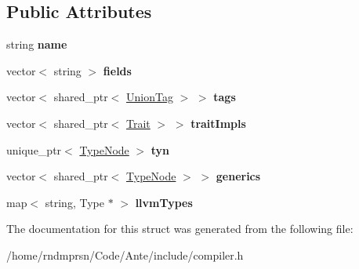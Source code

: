 \subsection*{Public Attributes}
\begin{DoxyCompactItemize}
\item 
\mbox{\label{structDataType_a27d0cdc5038d5ac6fc17c049f8dd8e9f}} 
string {\bfseries name}
\item 
\mbox{\label{structDataType_aa8650db01d88d73a10629db8590322a2}} 
vector$<$ string $>$ {\bfseries fields}
\item 
\mbox{\label{structDataType_ac62dd93ccfd6773019ab3aae0406cceb}} 
vector$<$ shared\+\_\+ptr$<$ \hyperlink{structUnionTag}{Union\+Tag} $>$ $>$ {\bfseries tags}
\item 
\mbox{\label{structDataType_a24120e708dca1374f94fe519f5b69870}} 
vector$<$ shared\+\_\+ptr$<$ \hyperlink{structTrait}{Trait} $>$ $>$ {\bfseries trait\+Impls}
\item 
\mbox{\label{structDataType_adc9504f8521ea326c0887e2ccf5d513f}} 
unique\+\_\+ptr$<$ \hyperlink{structTypeNode}{Type\+Node} $>$ {\bfseries tyn}
\item 
\mbox{\label{structDataType_a62a9cbd2dc44332609a60ddcfb1d9550}} 
vector$<$ shared\+\_\+ptr$<$ \hyperlink{structTypeNode}{Type\+Node} $>$ $>$ {\bfseries generics}
\item 
\mbox{\label{structDataType_a37d62f0f71e4e2beb4eebd8161ccbd26}} 
map$<$ string, Type $\ast$ $>$ {\bfseries llvm\+Types}
\end{DoxyCompactItemize}


The documentation for this struct was generated from the following file\+:\begin{DoxyCompactItemize}
\item 
/home/rndmprsn/\+Code/\+Ante/include/compiler.\+h\end{DoxyCompactItemize}
